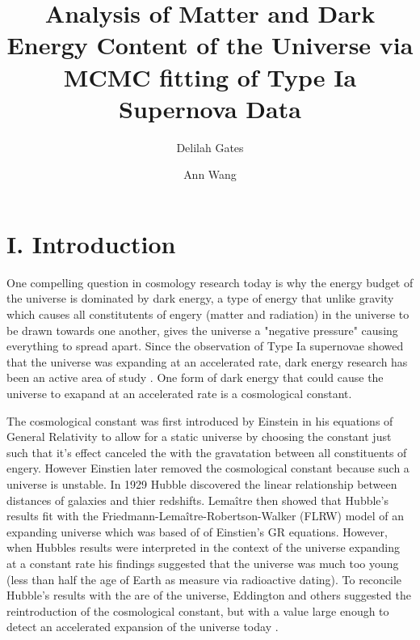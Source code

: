 \documentclass[aps,prl,reprint]{revtex4-1}
\begin{document}

\title{	Analysis of Matter and Dark Energy Content of the Universe via MCMC fitting of Type Ia Supernova Data}
\author{Delilah Gates}
\author{Ann Wang}
\begin{abstract}
\end{abstract}
\maketitle
\section{I. Introduction}
One compelling question in cosmology research today is why the energy budget of the universe is dominated by dark energy, a type of energy that unlike gravity which causes all constitutents of engery (matter and radiation) in the universe to be drawn towards one another, gives the universe a "negative pressure" causing everything to spread apart. Since the observation of Type Ia supernovae showed that the universe was expanding at an accelerated rate, dark energy research has been an active area of study \cite{riess_sn}. One form of dark energy that could cause the universe to exapand at an accelerated rate is a cosmological constant.

The cosmological constant was first introduced by Einstein in his equations of General Relativity to allow for a static universe by choosing the constant just such that it's effect canceled the with the gravatation between all constituents of engery. However Einstien later removed the cosmological constant because such a universe is unstable. In 1929 Hubble discovered the linear relationship between distances of galaxies and thier redshifts. Lemaître then showed that Hubble's results fit with the Friedmann-Lemaître-Robertson-Walker (FLRW) model of an expanding universe which was based of of Einstien's GR equations. However, when Hubbles results were interpreted in the context of the universe expanding at a constant rate his findings suggested that the universe was much too young (less than half the age of Earth as measure via radioactive dating). To reconcile Hubble's results with the are of the universe, Eddington and others suggested the reintroduction of the cosmological constant, but with a value large enough to detect an accelerated expansion of the universe today \cite{Straumann:2002he}. 
\end{document}
